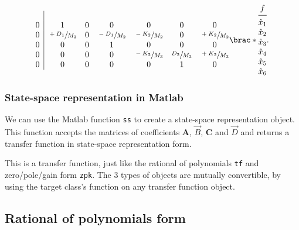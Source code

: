 \documentclass[12pt]{article}
\DeclarePairedDelimiter\brac[]%
\begin{document}
\begin{equation}
\begin{array}{*4{@{}c}@{}}
{\begin{array}{@{}c|*6c@{}}
            \\*
                0 & 1 & 0 & 0 & 0 & 0 & 0
            \\*
                0 & \sfrac{+D_1}{M_2} & 0 & \sfrac{-D_1}{M_2} & \sfrac{-K_2}{M_2} & 0 & \sfrac{+K_2}{M_2}
            \\*
                0 & 0 & 0 & 1 & 0 & 0 & 0
            \\*
                0 & 0 & 0 & 0 & \sfrac{-K_2}{M_3} &  \sfrac{D_2}{M_3} & \sfrac{+K_2}{M_3}
            \\*
                0 & 0 & 0 & 0 & 0 & 1 & 0
            \\*
            \end{array}
        }
        &
        \brac*{
            \begin{array}{@{}c@{}}
                f \\*
            \midrule
                {\hat{x}}_1 \\* {\hat{x}}_2 \\*
                {\hat{x}}_3 \\* {\hat{x}}_4 \\*
                {\hat{x}}_5 \\* {\hat{x}}_6 \\*
            \end{array}
        }.
    \end{array}
\end{equation}

\subsubsection{State-space representation in Matlab}

We can use the Matlab function \texttt{ss} to create a state-space representation object.
This function accepts the matrices of coefficients $\mathbf{A}$, $\vec{B}$, $\mathbf{C}$ and $\vec{D}$ and returns a transfer function in state-space representation form.

This is a transfer function, just like the rational of polynomials \texttt{tf} and zero/pole/gain form \texttt{zpk}.
The $3$ types of objects are mutually convertible,
by using the target class's function on any transfer function object.

\subsection{Rational of polynomials form}
\end{document}
